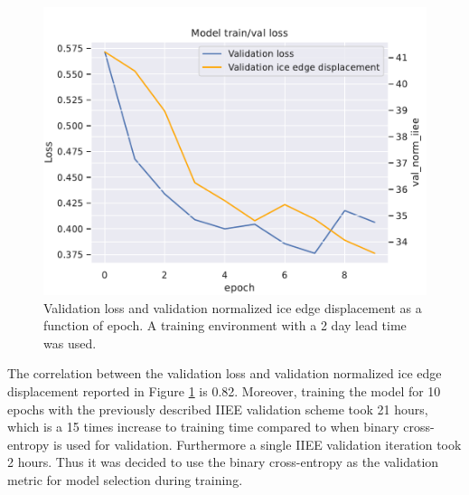 \documentclass[../main/thesis]{subfiles}
\begin{document}
\begin{figure}
    \centering
    \includegraphics[width=\textwidth]{val_loss_iiee}
    \caption{\label{fig:val_loss_iiee}Validation loss and validation normalized ice edge displacement as a function of epoch. A training environment with a 2 day lead time was used.}
\end{figure}

The correlation between the validation loss and validation normalized ice edge displacement reported in Figure \ref{fig:val_loss_iiee} is 0.82. Moreover, training the model for 10 epochs with the previously described IIEE validation scheme took 21 hours, which is a 15 times increase to training time compared to when binary cross-entropy is used for validation. Furthermore a single IIEE validation iteration took 2 hours. Thus it was decided to use the binary cross-entropy as the validation metric for model selection during training.

\biblio
\end{document}
